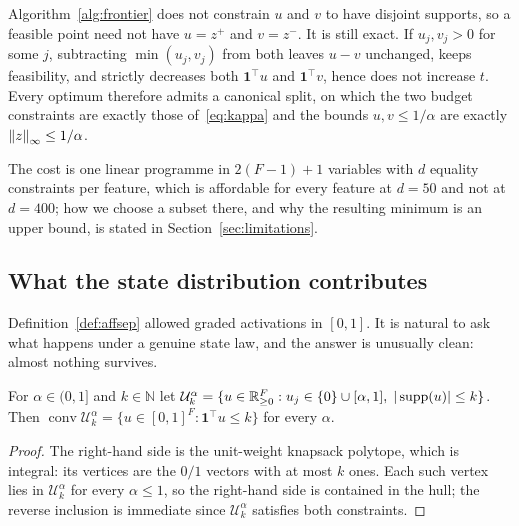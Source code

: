 \begin{remark}
\label{rem:split}
Algorithm~\ref{alg:frontier} does not constrain $u$ and $v$ to have disjoint supports, so a
feasible point need not have $u=z^{+}$ and $v=z^{-}$. It is still exact. If
$u_j,v_j>0$ for some $j$, subtracting $\min(u_j,v_j)$ from both leaves $u-v$ unchanged, keeps
feasibility, and strictly decreases both $\mathbf 1^{\top}u$ and $\mathbf 1^{\top}v$, hence does
not increase $t$. Every optimum therefore admits a canonical split, on which the two budget
constraints are exactly those of~\eqref{eq:kappa} and the bounds $u,v\le1/\alpha$ are exactly
$\left\lVert z \right\rVert_\infty\le1/\alpha$.
\end{remark}

The cost is one linear programme in $2(F-1)+1$ variables with $d$ equality constraints per
feature, which is affordable for every feature at $d=50$ and not at $d=400$; how we choose a
subset there, and why the resulting minimum is an upper bound, is stated in
Section~\ref{sec:limitations}.

\subsection{What the state distribution contributes}
\label{sec:frontier-amplitudes}

Definition~\ref{def:affsep} allowed graded activations in $[0,1]$. It is natural to ask what
happens under a genuine state law, and the answer is unusually clean: almost nothing survives.

\begin{proposition}
\label{prop:knapsack}
For $\alpha\in(0,1]$ and $k\in\mathbb N$ let
$\mathcal U_k^{\alpha}=\{u\in\mathbb{R}_{\ge0}^{F}:u_j\in\{0\}\cup[\alpha,1],\;
|\operatorname{supp}(u)|\le k\}$. Then
$\operatorname{conv}\mathcal U_k^{\alpha}=\{u\in[0,1]^F:\mathbf 1^{\top}u\le k\}$ for every
$\alpha$.
\end{proposition}

\begin{proof}
The right-hand side is the unit-weight knapsack polytope, which is integral: its vertices are the
$0/1$ vectors with at most $k$ ones. Each such vertex lies in $\mathcal U_k^{\alpha}$ for every
$\alpha\le1$, so the right-hand side is contained in the hull; the reverse inclusion is immediate
since $\mathcal U_k^{\alpha}$ satisfies both constraints.
\end{proof}

